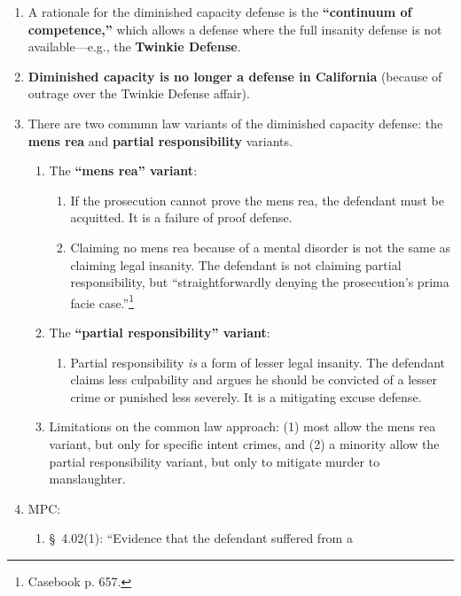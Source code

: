 \begin{enumerate}
    \item A rationale for the diminished capacity defense is the 
    \textbf{``continuum of competence,''} which allows a defense where the 
    full insanity defense is not available---e.g., the \textbf{Twinkie 
    Defense}.
    \item \textbf{Diminished capacity is no longer a defense in California} 
    (because of outrage over the Twinkie Defense affair).
    \item There are two commmn law variants of the diminished capacity defense: the 
    \textbf{mens rea} and \textbf{partial responsibility} variants.
    \begin{enumerate}
        \item The \textbf{``mens rea'' variant}:
        \begin{enumerate}
            \item If the prosecution cannot prove the mens rea, the defendant must 
            be acquitted. It is a failure of proof defense.
            \item Claiming no mens rea because of a mental disorder is not the 
            same as claiming legal insanity. The defendant is not claiming partial 
            responsibility, but ``straightforwardly denying the prosecution's 
            prima facie case.''\footnote{Casebook p. 657.}
        \end{enumerate}
        \item The \textbf{``partial responsibility'' variant}:
        \begin{enumerate}
            \item Partial responsibility \emph{is} a form of lesser legal 
            insanity. The defendant claims less culpability and argues he should 
            be convicted of a lesser crime or punished less severely. It is a 
            mitigating excuse defense.
        \end{enumerate}
        \item Limitations on the common law approach: (1) most allow the mens rea 
        variant, but only for specific intent crimes, and (2) a minority allow 
        the partial responsibility variant, but only to mitigate murder to 
        manslaughter.
    \end{enumerate}
    \item MPC:
    \begin{enumerate}
        \item \S\ 4.02(1): ``Evidence that the defendant suffered from a 

\end{enumerate}
\end{enumerate}
